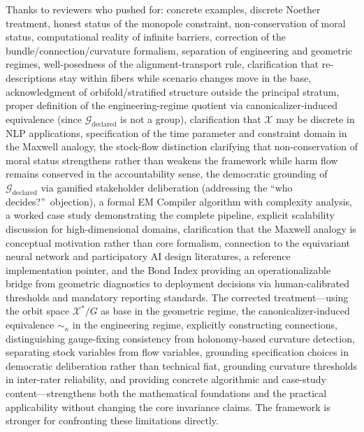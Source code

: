 \documentclass[12pt]{article}
\begin{document}
Thanks to reviewers who pushed for: concrete examples, discrete Noether treatment, honest status of the monopole constraint, non-conservation of moral status, computational reality of infinite
barriers, correction of the bundle/connection/curvature formalism, separation of engineering and
geometric regimes, well-posedness of the alignment-transport rule, clarification that re-descriptions
stay within fibers while scenario changes move in the base, acknowledgment of orbifold/stratified
structure outside the principal stratum, proper definition of the engineering-regime quotient via
canonicalizer-induced equivalence (since $\mathcal{G}_{\text{declared}}$ is not a group), clarification that $\mathcal{X}$ may be discrete in NLP applications, specification of the time parameter and constraint domain in the Maxwell
analogy, the stock-flow distinction clarifying that non-conservation of moral status strengthens
rather than weakens the framework while harm flow remains conserved in the accountability sense,
the democratic grounding of $\mathcal{G}_{\text{declared}}$ via gamified stakeholder deliberation (addressing the ``who
decides?''\ objection), a formal EM Compiler algorithm with complexity analysis, a worked case
study demonstrating the complete pipeline, explicit scalability discussion for high-dimensional domains, clarification that the Maxwell analogy is conceptual motivation rather than core formalism,
connection to the equivariant neural network and participatory AI design literatures, a reference
implementation pointer, and the Bond Index providing an operationalizable bridge from geometric diagnostics to deployment decisions via human-calibrated thresholds and mandatory reporting
standards. The corrected treatment---using the orbit space $\mathcal{X}^*/G$ as base in the geometric regime,
the canonicalizer-induced equivalence $\sim_\kappa$ in the engineering regime, explicitly constructing connections, distinguishing gauge-fixing consistency from holonomy-based curvature detection, separating
stock variables from flow variables, grounding specification choices in democratic deliberation rather
than technical fiat, grounding curvature thresholds in inter-rater reliability, and providing concrete
algorithmic and case-study content---strengthens both the mathematical foundations and the practical applicability without changing the core invariance claims. The framework is stronger for
confronting these limitations directly.
\end{document}
